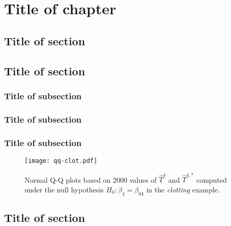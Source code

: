 \chapter{Title of chapter}

\fancyhead[RO,LE]{\thepage}

\setlength{\parskip}{0.5pt}

\bigskip

\section{Title of section} 
\noindent

\section{Title of section}
\noindent

\subsection{Title of subsection}
\noindent


\subsection{Title of subsection}
\noindent


\subsection{Title of subsection}
\noindent

\begin{figure}[!h]\centering
	\texttt{[image: qq-clot.pdf]}
	
	\caption{\label{qq-clot}Normal Q-Q plots based on 2000 values of $\widehat{T}^4$ and $\widehat{T}^{4,*}$ computed under the null hypothesis $H_0\!:\beta_4=\beta_{04}$ in the \emph{clotting} example.}
\end{figure}

\section{Title of section}
\noindent